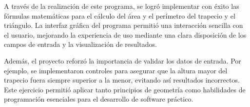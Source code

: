A través de la realización de este programa, se logró implementar con éxito las fórmulas matemáticas para el cálculo del área y el perímetro del trapecio y el triángulo. La interfaz gráfica del programa permitió una interacción sencilla con el usuario, mejorando la experiencia de uso mediante una clara disposición de los campos de entrada y la visualización de resultados.

Además, el proyecto reforzó la importancia de validar los datos de entrada. Por ejemplo, se implementaron controles para asegurar que la altura mayor del trapecio fuera siempre superior a la menor, evitando así resultados incorrectos. Este ejercicio permitió aplicar tanto principios de geometría como habilidades de programación esenciales para el desarrollo de software práctico.
